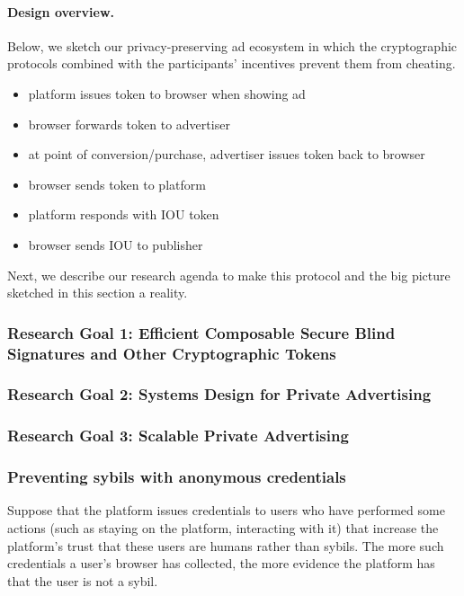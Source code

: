 \paragraph{Design overview.}
%
Below, we sketch our privacy-preserving ad ecosystem in which the cryptographic protocols combined with the participants' incentives prevent them from cheating.
%


\begin{itemize}
 \item platform issues token to browser when showing ad
 \item browser forwards token to advertiser
 \item at point of conversion/purchase, advertiser issues token back to browser
 \item browser sends token to platform
 \item platform responds with IOU token
 \item browser sends IOU to publisher
\end{itemize}


Next, we describe our research agenda to make this protocol and the big picture sketched in this section a reality.

\subsubsection{Research Goal 1: Efficient Composable Secure Blind Signatures and Other Cryptographic Tokens}

\subsubsection{Research Goal 2: Systems Design for Private Advertising}

\subsubsection{Research Goal 3: Scalable Private Advertising}

\subsubsection{Preventing sybils with anonymous credentials} 
%
Suppose that the platform issues credentials to users who have performed some actions (such as staying on the platform, interacting with it) that increase the platform's trust that these users are humans rather than sybils.  
%
The more such credentials a user's browser has collected, the more evidence the platform has that the user is not a sybil.  

